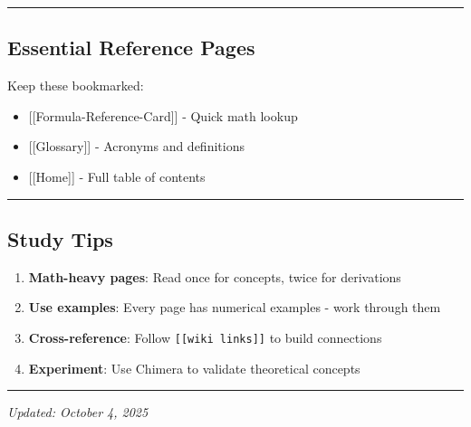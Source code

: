 \begin{center}\rule{0.5\linewidth}{0.5pt}\end{center}

\subsection{\texorpdfstring{ Essential Reference
Pages}{ Essential Reference Pages}}\label{essential-reference-pages}

Keep these bookmarked:

\begin{itemize}
\tightlist
\item
  {[}{[}Formula-Reference-Card{]}{]} - Quick math lookup
\item
  {[}{[}Glossary{]}{]} - Acronyms and definitions
\item
  {[}{[}Home{]}{]} - Full table of contents
\end{itemize}

\begin{center}\rule{0.5\linewidth}{0.5pt}\end{center}

\subsection{\texorpdfstring{ Study Tips}{ Study Tips}}\label{study-tips}

\begin{enumerate}
\def\labelenumi{\arabic{enumi}.}
\tightlist
\item
  \textbf{Math-heavy pages}: Read once for concepts, twice for
  derivations
\item
  \textbf{Use examples}: Every page has numerical examples - work
  through them
\item
  \textbf{Cross-reference}: Follow \texttt{{[}{[}wiki\ links{]}{]}} to
  build connections
\item
  \textbf{Experiment}: Use Chimera to validate theoretical concepts
\end{enumerate}

\begin{center}\rule{0.5\linewidth}{0.5pt}\end{center}

\emph{Updated: October 4, 2025}
